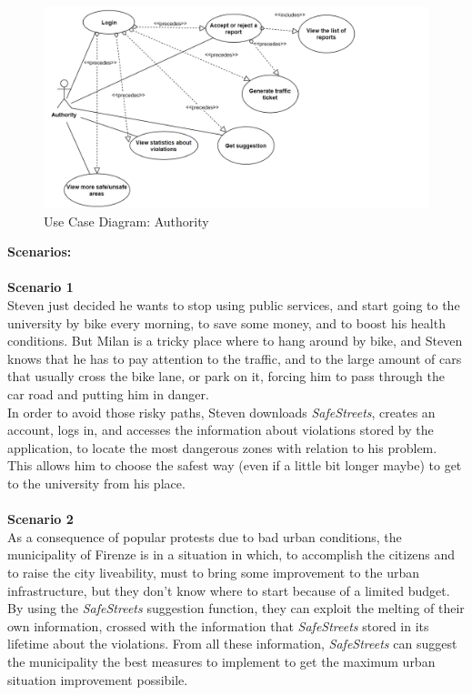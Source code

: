     
    
    
     \begin{figure}[H]
          \includegraphics[width=1.1\textwidth,left]{Images/UCD_authority.png}
        \caption{Use Case Diagram: Authority}
    \end{figure}


\vspace{18mm}
\textbf{Scenarios:}\\\\
\textbf{Scenario 1}\\
Steven just decided he wants to stop using public services, and start going to the university by bike every morning, to save some money, and to boost his health conditions. But Milan is a tricky place where to hang around by bike, and Steven knows that he has to pay attention to the traffic, and to the large amount of cars that usually cross the bike lane, or park on it, forcing him to pass through the car road and putting him in danger. \\
In order to avoid those risky paths, Steven downloads \textit{SafeStreets}, creates an account, logs in, and accesses the information about violations stored by the application, to locate the most dangerous zones with relation to his problem. This allows him to choose the safest way (even if a little bit longer maybe) to get to the university from his place.\\\\

\noindent\textbf{Scenario 2}\\
As a consequence of popular protests due to bad urban conditions, the municipality of Firenze is in a situation in which, to accomplish the citizens and to raise the city liveability, must to bring some improvement to the urban infrastructure, but they don't know where to start because of a limited budget.\\
By using the \textit{SafeStreets} suggestion function, they can exploit the melting of their own information, crossed with the information that \textit{SafeStreets} stored in its lifetime about the violations. From all these information, \textit{SafeStreets} can suggest the municipality the best measures to implement to get the maximum urban situation improvement possibile.  \\

